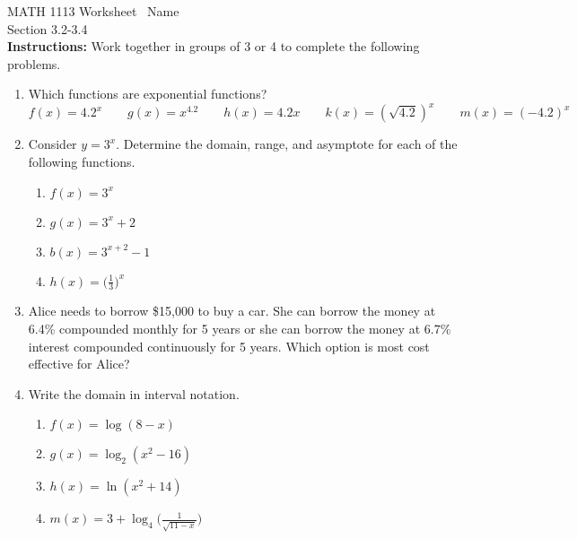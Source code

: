 \documentclass[11pt]{article}
\begin{document}
\noindent MATH 1113   \quad\quad\quad\quad\quad Worksheet \quad\quad\quad\quad\quad\   Name \underline{\phantom{alphabetsoupismyveryveryfavorite}}\\ 
\noindent Section 3.2-3.4 \\




\noindent \textbf{Instructions:}  Work together in groups of  3 or 4 to complete the following problems.



\begin{enumerate}

\item Which functions are exponential functions?
$$f(x)=4.2^x \quad \quad g(x)=x^{4.2} \quad \quad h(x)=4.2x \quad \quad k(x)=(\sqrt{4.2})^x \quad \quad m(x)=(-4.2)^x$$

\item Consider $y=3^x$.  Determine the domain, range, and asymptote for each of the following functions.

\begin{enumerate}
\item $f(x)=3^x$\vfill
\item $g(x)=3^x+2$\vfill
\item $b(x)=3^{x+2}-1$\vfill


\item  $\displaystyle h(x)=\Big(\frac{1}{3}\Big)^x$
\vfill


\end{enumerate}

\item Alice needs to borrow \$15,000 to buy a car.  She can borrow the money at 6.4\% compounded monthly for 5 years or she can borrow the money at 6.7\% interest compounded continuously for 5 years.  Which option is most cost effective for Alice?

\vfill
\vfill

\newpage

\item Write the domain in interval notation.
\begin{enumerate}
\item $f(x)=\log(8-x)$ 
\vfill
\item $g(x)=\log_2 (x^2-16)$ 
\vfill
\item $h(x)=\ln(x^2+14)$
\vfill
\item $\displaystyle m(x)=3+\log_4\Bigg(\frac{1}{\sqrt{11-x}}\Bigg)$
\vfill
\end{enumerate}




\end{enumerate}
\end{document}
